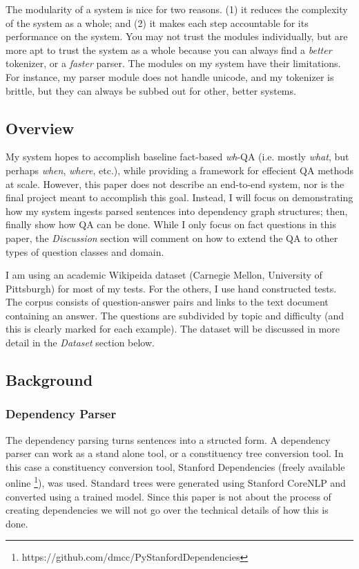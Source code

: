 \documentclass[twoside]{article}
\begin{document}
The modularity of a system is nice for two reasons.  (1) it reduces the complexity of the system as a whole; and (2) it makes each step accountable for its performance on the system.  You may not trust the modules individually, but are more apt to trust the system as a whole because you can always find a \textit{better} tokenizer, or a \textit{faster} parser.  The modules on my system have their limitations.  For instance, my parser module does not handle unicode, and my tokenizer is brittle, but they can always be subbed out for other, better systems.

\subsection{Overview}

My system hopes to accomplish baseline fact-based \textit{wh}-QA (i.e. mostly \textit{what}, but perhaps \textit{when}, \textit{where}, etc.), while providing a framework for effecient QA methods at scale. However, this paper does not describe an end-to-end system, nor is the final project meant to accomplish this goal.  Instead, I will focus on demonstrating how my system ingests parsed sentences into dependency graph structures; then, finally show how QA can be done.  While I only focus on fact questions in this paper, the \textit{Discussion} section will comment on how to extend the QA to other types of question classes and domain.

I am using an academic Wikipeida dataset (Carnegie Mellon, University of Pittsburgh) for most of my tests.  For the others, I use hand constructed tests.  The corpus consists of question-answer pairs and links to the text document containing an answer.  The questions are subdivided by topic and difficulty (and this is clearly marked for each example). The dataset will be discussed in more detail in the \textit{Dataset} section below.

\subsection{Background}

\subsubsection{Dependency Parser}

The dependency parsing turns sentences into a structed form.  A dependency parser can work as a stand alone tool, or a constituency tree conversion tool.  In this case a constituency conversion tool, Stanford Dependencies (freely available online \footnote{https://github.com/dmcc/PyStanfordDependencies}), was used.  Standard trees were generated using Stanford CoreNLP and converted using a trained model.  Since this paper is not about the process of creating dependencies we will not go over the technical details of how this is done.
\end{document}
